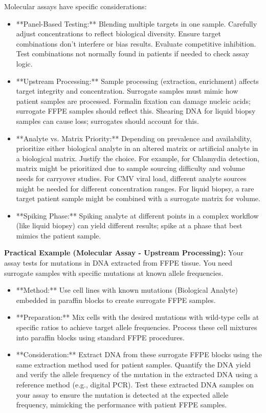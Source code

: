 \documentclass{article}
\begin{document}
Molecular assays have specific considerations:
\begin{itemize}
    \item **Panel-Based Testing:** Blending multiple targets in one sample. Carefully adjust concentrations to reflect biological diversity. Ensure target combinations don't interfere or bias results. Evaluate competitive inhibition. Test combinations not normally found in patients if needed to check assay logic.
    \item **Upstream Processing:** Sample processing (extraction, enrichment) affects target integrity and concentration. Surrogate samples must mimic how patient samples are processed. Formalin fixation can damage nucleic acids; surrogate FFPE samples should reflect this. Shearing DNA for liquid biopsy samples can cause loss; surrogates should account for this.
    \item **Analyte vs. Matrix Priority:** Depending on prevalence and availability, prioritize either biological analyte in an altered matrix or artificial analyte in a biological matrix. Justify the choice. For example, for Chlamydia detection, matrix might be prioritized due to sample sourcing difficulty and volume needs for carryover studies. For CMV viral load, different analyte sources might be needed for different concentration ranges. For liquid biopsy, a rare target patient sample might be combined with a surrogate matrix for volume.
    \item **Spiking Phase:** Spiking analyte at different points in a complex workflow (like liquid biopsy) can yield different results; spike at a phase that best mimics the patient sample.
\end{itemize}

\textbf{Practical Example (Molecular Assay - Upstream Processing):}
Your assay tests for mutations in DNA extracted from FFPE tissue. You need surrogate samples with specific mutations at known allele frequencies.
\begin{itemize}
    \item **Method:** Use cell lines with known mutations (Biological Analyte) embedded in paraffin blocks to create surrogate FFPE samples.
    \item **Preparation:** Mix cells with the desired mutations with wild-type cells at specific ratios to achieve target allele frequencies. Process these cell mixtures into paraffin blocks using standard FFPE procedures.
    \item **Consideration:** Extract DNA from these surrogate FFPE blocks using the same extraction method used for patient samples. Quantify the DNA yield and verify the allele frequency of the mutation in the extracted DNA using a reference method (e.g., digital PCR). Test these extracted DNA samples on your assay to ensure the mutation is detected at the expected allele frequency, mimicking the performance with patient FFPE samples.
\end{itemize}
\end{document}

